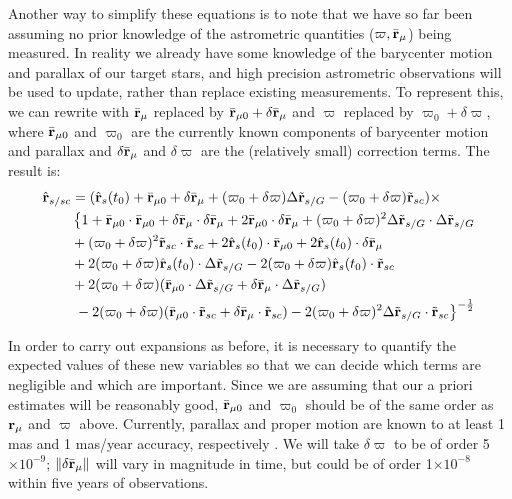 Another way to simplify these equations is to note that we have so far been assuming no prior knowledge of the astrometric quantities ($\varpi, \bar{\mathbf{r}}_\mu$) being measured.  In reality we already have some knowledge of the barycenter motion and parallax of our target stars, and high precision astrometric observations will be used to update, rather than replace existing measurements.  To represent this, we can rewrite 
with $\bar{\mathbf{r}}_{\mu}$ replaced by $\bar{\mathbf{r}}_{\mu0}+ \delta\bar{\mathbf{r}}_\mu$ and $\varpi$ replaced by $\varpi_0 + \delta\varpi$, where $\bar{\mathbf{r}}_{\mu0}$ and $\varpi_0$ are the currently known components of barycenter motion and parallax and $\delta\bar{\mathbf{r}}_\mu$ and $\delta\varpi$ are the (relatively small) correction terms. The result is:
\begin{equation}\label{eq:rhat_norm2}
\begin{split}
\hat{\mathbf{r}}_{s/sc} &= (\hat{\mathbf{r}}_s(t_0) + \bar{\mathbf{r}}_{\mu0} + \delta\bar{\mathbf{r}}_\mu  +(\varpi_0 + \delta\varpi)\Delta \tilde{\mathbf{r}}_{s/G} - (\varpi_0 + \delta\varpi)\tilde{\mathbf{r}}_{sc})\times  \\
&\left\{1 + \bar{\mathbf{r}}_{\mu0} \cdot \bar{\mathbf{r}}_{\mu0} + \delta\bar{\mathbf{r}}_\mu \cdot \delta\bar{\mathbf{r}}_\mu + 2 \bar{\mathbf{r}}_{\mu0} \cdot \delta\bar{\mathbf{r}}_\mu + (\varpi_0 + \delta\varpi)^2\Delta \tilde{\mathbf{r}}_{s/G} \cdot \Delta \tilde{\mathbf{r}}_{s/G}\right.\\
 &{} + (\varpi_0 + \delta\varpi)^2\tilde{\mathbf{r}}_{sc} \cdot \tilde{\mathbf{r}}_{sc} + 2\hat{\mathbf{r}}_s(t_0) \cdot \bar{\mathbf{r}}_{\mu0} + 2\hat{\mathbf{r}}_s(t_0) \cdot \delta\bar{\mathbf{r}}_\mu \\
 &{} + 2 (\varpi_0 + \delta\varpi) \hat{\mathbf{r}}_s(t_0) \cdot \Delta \tilde{\mathbf{r}}_{s/G} - 2(\varpi_0 + \delta\varpi)\hat{\mathbf{r}}_s(t_0) \cdot \tilde{\mathbf{r}}_{sc} \\
 &{}  +  2(\varpi_0 + \delta\varpi) (\bar{\mathbf{r}}_{\mu0}  \cdot  \Delta \tilde{\mathbf{r}}_{s/G} + \delta\bar{\mathbf{r}}_\mu \cdot  \Delta \tilde{\mathbf{r}}_{s/G} )\\
&\left.{} - 2(\varpi_0 + \delta\varpi) (\bar{\mathbf{r}}_{\mu0}\cdot \tilde{\mathbf{r}}_{sc} + \delta\bar{\mathbf{r}}_\mu\cdot \tilde{\mathbf{r}}_{sc}) - 2(\varpi_0 + \delta\varpi)^2 \Delta \tilde{\mathbf{r}}_{s/G} \cdot \tilde{\mathbf{r}}_{sc}\right\}^{-\frac{1}{2}}
\end{split}
\end{equation}

In order to carry out expansions as before, it is necessary to quantify the expected values of these new variables so that we can decide which terms are negligible and which are important.  Since we are assuming that our a priori estimates will be reasonably good, $\bar{\mathbf{r}}_{\mu0}$ and $\varpi_0$ should be of the same order as $\mathbf{r}_\mu$ and $\varpi$ above.  Currently, parallax and proper motion are known to at least 1 mas and 1 mas/year accuracy, respectively \citep{turon1995}.  We will take  $\delta\varpi$ to be of order 5$\times10^{-9}$; $\Vert\delta\bar{\mathbf{r}}_\mu\Vert$ will vary in magnitude in time, but could be of order 1$\times10^{-8}$ within five years of observations.  

